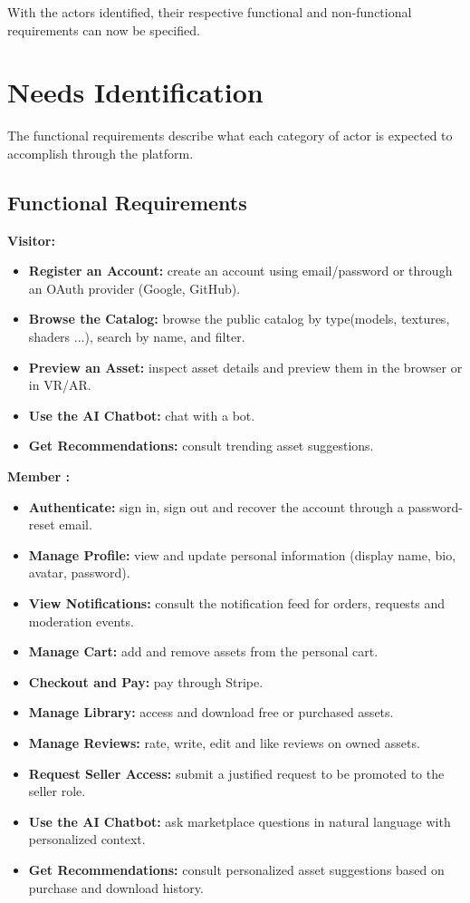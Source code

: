 With the actors identified, their respective functional and non-functional requirements can now be specified.

\section{Needs Identification}

The functional requirements describe what each category of actor is expected to accomplish through the platform.

\subsection{Functional Requirements}



\textbf{Visitor:}

\begin{itemize}[label=---,leftmargin=2em]
  \item \textbf{Register an Account:} create an account using email/password or through an OAuth provider (Google, GitHub). 
  \item \textbf{Browse the Catalog:} browse the public catalog by type(models, textures, shaders ...), search by name, and filter.
  \item \textbf{Preview an Asset:} inspect asset details and preview them in the browser or in VR/AR.
  \item \textbf{Use the AI Chatbot:} chat with a bot.
  \item \textbf{Get Recommendations:} consult trending asset suggestions.
\end{itemize}

\textbf{Member :}

\begin{itemize}[label=---,leftmargin=2em]
  \item \textbf{Authenticate:} sign in, sign out and recover the account through a password-reset email.
  \item \textbf{Manage Profile:} view and update personal information (display name, bio, avatar, password).
  \item \textbf{View Notifications:} consult the notification feed for orders, requests and moderation events.
  \item \textbf{Manage Cart:} add and remove assets from the personal cart.
  \item \textbf{Checkout and Pay:} pay through Stripe.
  \item \textbf{Manage Library:} access and download free or purchased assets.
  \item \textbf{Manage Reviews:} rate, write, edit and like reviews on owned assets.
  \item \textbf{Request Seller Access:} submit a justified request to be promoted to the seller role.
  \item \textbf{Use the AI Chatbot:} ask marketplace questions in natural language with personalized context.
  \item \textbf{Get Recommendations:} consult personalized asset suggestions based on purchase and download history.
\end{itemize}

